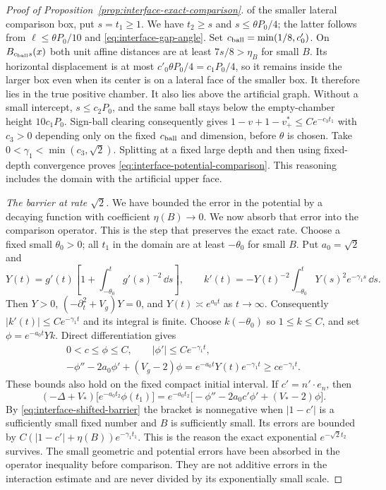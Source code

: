 \begin{proof}[Proof of Proposition~\ref{prop:interface-exact-comparison}]
of the smaller lateral comparison box, put $s=t_1\ge1$.  We have
$t_2\ge s$ and $s\le\theta P_0/4$; the latter follows from
$\ell\le\theta P_0/10$ and \eqref{eq:interface-gap-angle}.
Set $c_{\rm ball}=\min(1/8,c'_0)$.
On $B_{c_{\rm ball}s}(x)$ both unit affine distances are at least
$7s/8>\eta_B$ for small $B$.  Its horizontal displacement is at
most $c'_0\theta P_0/4=c_1P_0/4$, so it remains inside the larger
box even when its center is on a lateral face of the smaller box.
It therefore lies in the true positive chamber.  It also lies above
the artificial graph.  Without a small intercept, $s\le c_2P_0$,
and the same ball stays below the empty-chamber height $10c_1P_0$.
Sign-ball clearing consequently gives
$1-v+1-v^*_+\le Ce^{-c_3t_1}$ with $c_3>0$ depending only on the
fixed $c_{\rm ball}$ and dimension, before $\theta$ is chosen.
Take $0<\gamma_1<\min(c_3,\sqrt2)$.  Splitting at a fixed large depth and then
using fixed-depth convergence proves \eqref{eq:interface-potential-comparison}.
This reasoning includes the domain with the artificial upper face.

\emph{The barrier at rate $\sqrt2$.}
We have bounded the error in the potential by a decaying function
with coefficient $\eta(B)\to0$.  We now absorb that error into
the comparison operator.  This is the step that preserves the exact rate.
Choose
a fixed small $\theta_0>0$; all $t_1$ in the domain are at least
$-\theta_0$ for small $B$.  Put $a_0=\sqrt2$ and
\[
 Y(t)=g'(t)\left[1+\int_{-\theta_0}^t g'(s)^{-2}\,\dd s\right],
 \qquad
 k'(t)=-Y(t)^{-2}\int_{-\theta_0}^tY(s)^2e^{-\gamma_1s}\,\dd s.
\]
Then $Y>0$, $(-\partial_t^2+V_g)Y=0$, and
$Y(t)\asymp e^{a_0t}$ as $t\to\infty$.
Consequently $|k'(t)|\le Ce^{-\gamma_1t}$ and its integral is
finite.  Choose $k(-\theta_0)$ so $1\le k\le C$, and set
$\phi=e^{-a_0t}Yk$.  Direct differentiation gives
\begin{equation}\label{eq:interface-shifted-barrier}
 \begin{gathered}
 0<c\le\phi\le C,\qquad |\phi'|\le Ce^{-\gamma_1t},\\
 -\phi''-2a_0\phi'+(V_g-2)\phi
       =e^{-a_0t}Y(t)e^{-\gamma_1t}
       \ge c e^{-\gamma_1t}.
 \end{gathered}
\end{equation}
These bounds also hold on the fixed compact initial interval.
If $c'=n'\cdot e_n$, then
\[
 (-\Delta+V_*)\bigl[e^{-a_0t_2}\phi(t_1)\bigr]
 =e^{-a_0t_2}
   \bigl[-\phi''-2a_0c'\phi'+(V_*-2)\phi\bigr].
\]
By \eqref{eq:interface-shifted-barrier} the bracket is nonnegative
when $|1-c'|$ is a sufficiently small fixed number and $B$ is
sufficiently small.  Its errors are bounded by
$C(|1-c'|+\eta(B))e^{-\gamma_1t_1}$.
This is the reason the exact exponential $e^{-\sqrt2t_2}$ survives.
The small geometric and potential errors have been absorbed in the
operator inequality before comparison.  They are not additive errors
in the interaction estimate and are never divided by its exponentially
small scale.


\end{proof}
